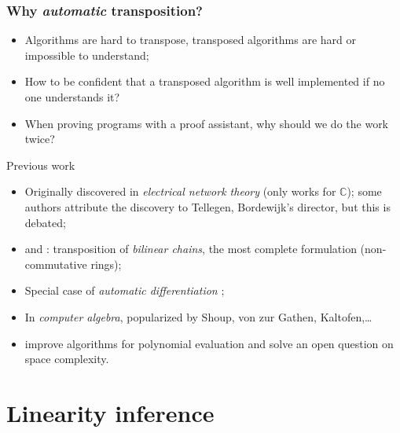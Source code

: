\documentclass[10pt]{beamer}
\newcommand{\C}{\mathbb{C}}
\begin{document}

\begin{frame}
  \frametitle{Why \emph{automatic} transposition?}

  \begin{itemize}
  \item Algorithms are hard to transpose, transposed algorithms are
    hard or impossible to understand;
  \item How to be confident that a transposed algorithm is well
    implemented if no one understands it?
  \item When proving programs with a proof assistant, why should we do
    the work twice?
  \end{itemize}

  \begin{block}{Previous work}
    \begin{itemize}
    \item Originally discovered in \emph{electrical network theory}
      \cite{Bor56} (only works for $\C$); some authors attribute the
      discovery to Tellegen, Bordewijk's director, but this is
      debated;
    \item \cite{Fid73} and \cite{HoMu73}: transposition of
      \emph{bilinear chains}, the most complete formulation
      (non-commutative rings);
    \item Special case of \emph{automatic differentiation}
      \cite{BS83};
    \item In \emph{computer algebra}, popularized by Shoup, von zur
      Gathen, Kaltofen,\dots
    \item \cite{BLS03} improve algorithms for polynomial evaluation
      and solve an open question on space complexity.
    \end{itemize}
  \end{block}
\end{frame}


\section{Linearity inference}
\end{document}
